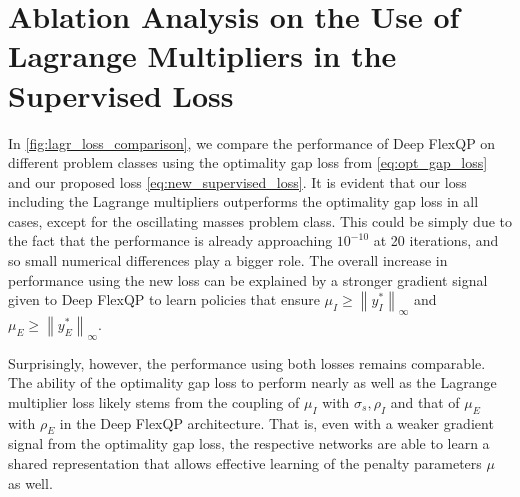 \documentclass{article} %
\newcommand{\norm}[1]{\left\lVert#1\right\rVert}
\begin{document}
\clearpage
\section{Ablation Analysis on the Use of Lagrange Multipliers in the Supervised Loss}
\label{appendix:ablation_lagr_mult_loss}

In \cref{fig:lagr_loss_comparison}, we compare the performance of Deep FlexQP on different problem classes using the optimality gap loss from \cref{eq:opt_gap_loss} and our proposed loss \cref{eq:new_supervised_loss}. It is evident that our loss including the Lagrange multipliers outperforms the optimality gap loss in all cases, except for the oscillating masses problem class. This could be simply due to the fact that the performance is already approaching $10^{-10}$ at 20 iterations, and so small numerical differences play a bigger role. The overall increase in performance using the new loss can be explained by a stronger gradient signal given to Deep FlexQP to learn policies that ensure $\mu_I \geq \norm{y_I^*}_\infty$ and $\mu_E\geq \norm{y_E^*}_\infty$.

Surprisingly, however, the performance using both losses remains comparable. The ability of the optimality gap loss to perform nearly as well as the Lagrange multiplier loss likely stems from the coupling of $\mu_I$ with $\sigma_s, \rho_I$ and that of $\mu_E$ with $\rho_E$ in the Deep FlexQP architecture. That is, even with a weaker gradient signal from the optimality gap loss, the respective networks are able to learn a shared representation that allows effective learning of the penalty parameters $\mu$ as well.
\end{document}
